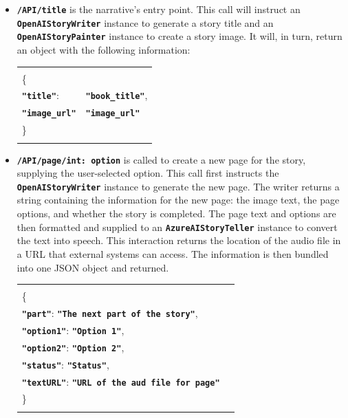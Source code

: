 \documentclass[conference]{IEEEtran}
\begin{document}
	\begin{itemize}
		\item \textbf{\texttt{/API/title}} is the narrative's entry point. This call will instruct an \textbf{\texttt{OpenAIStoryWriter}} instance to generate a story title and an \textbf{\texttt{OpenAIStoryPainter}} instance to create a story image. It will, in turn, return an object with the following information:
		\begin{tabular}{ll}
			& \\
			\{& \\
			\textbf{\texttt{"title"}}: & \textbf{\texttt{"book\_title"}},\\
			\textbf{\texttt{"image\_url"}}& \textbf{\texttt{"image\_url"}}\\
			\}& \\
			& \\
		\end{tabular}

		\item \textbf{\texttt{/API/page/int: option}} is called to create a new page for the story, supplying the user-selected option. This call first instructs the \textbf{\texttt{OpenAIStoryWriter}} instance to generate the new page. The writer returns a string containing the information for the new page: the image text, the page options, and whether the story is completed. The page text and options are then formatted and supplied to an \textbf{\texttt{AzureAIStoryTeller}} instance to convert the text into speech. This interaction returns the location of the audio file in a URL that external systems can access. The information is then bundled into one JSON object and returned.
	
		\begin{tabular}{ll}
			& \\
			\{& \\
			\textbf{\texttt{"part"}}: \textbf{\texttt{"The next part of the story"}},\\
			\textbf{\texttt{"option1"}}: \textbf{\texttt{"Option 1"}},\\
			\textbf{\texttt{"option2"}}: \textbf{\texttt{"Option 2"}},\\
			\textbf{\texttt{"status"}}: \textbf{\texttt{"Status"}},\\
			\textbf{\texttt{"textURL"}}: \textbf{\texttt{"URL of the aud file for page"}}\\
			\}& \\
			& \\
		\end{tabular}
	\end{itemize}
	
\end{document}
